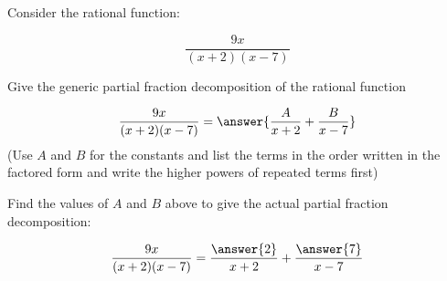\documentclass{ximera}
\author{Nicholas Hemleben}
\begin{document}
\begin{exercise}


Consider the rational function:

\[ 
\frac{9x}{(x+2)(x-7)} 
\]

Give the generic partial fraction decomposition of the rational function

\[
\frac{9x}{(x+2)(x-7)} = \answer{\frac{A}{x+2} + \frac{B}{x-7}}
\]
(Use $A$ and $B$ for the constants and list the terms in the order written in the factored form and write the higher powers of repeated terms first)
\begin{exercise}
Find the values of $A$ and $B$ above to give the actual partial fraction decomposition:

\[
\frac{9x}{(x+2)(x-7)} = \frac{\answer{2}}{x+2} + \frac{\answer{7}}{x-7}
\]
\end{exercise}


\end{exercise}
\end{document}

